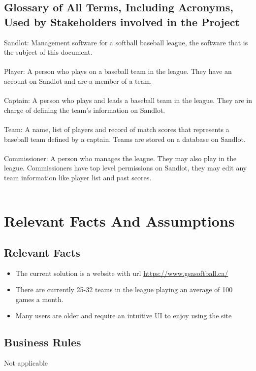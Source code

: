 \documentclass[12pt]{article}
\begin{document}
\subsection{Glossary of All Terms, Including Acronyms, Used by Stakeholders
involved in the Project}
Sandlot: Management software for a softball baseball league, the software that
is the subject of this document.\\\\
Player: A person who plays on a baseball team in the league. They have an
account on Sandlot and are a member of a team.\\\\
Captain: A person who plays and leads a baseball team in the league. They are
in charge of defining the team's information on Sandlot.\\\\
Team: A name, list of players and record of match scores that represents a
baseball team defined by a captain. Teams are stored on a database on Sandlot.
\\\\
Commissioner: A person who manages the league. They may also play in the
league. Commissioners have top level permissions on Sandlot, they may edit any
team information like player list and past scores.\\\\



\section{Relevant Facts And Assumptions}
\subsection{Relevant Facts}
\begin{itemize}
  \item The current solution is a website with url 
  \url{https://www.gsasoftball.ca/}
  \item There are currently 25-32 teams in the league playing an average of
  100 games a month.
  \item Many users are older and require an intuitive UI to enjoy using the
  site
\end{itemize}

\subsection{Business Rules}
Not applicable
\end{document}
